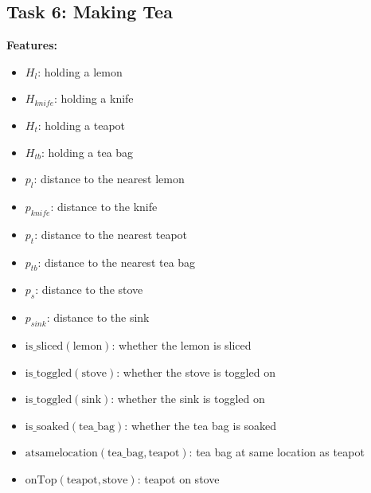 \subsection{Task 6: Making Tea}

\textbf{Features:}
\begin{itemize}[noitemsep]
    \item $H_l$: holding a lemon
    \item $H_{knife}$: holding a knife
    \item $H_t$: holding a teapot
    \item $H_{tb}$: holding a tea bag
    \item $p_l$: distance to the nearest lemon
    \item $p_{knife}$: distance to the knife
    \item $p_t$: distance to the nearest teapot
    \item $p_{tb}$: distance to the nearest tea bag
    \item $p_s$: distance to the stove
    \item $p_{sink}$: distance to the sink
    \item $\text{is\_sliced}(\text{lemon})$: whether the lemon is sliced
    \item $\text{is\_toggled}(\text{stove})$: whether the stove is toggled on
    \item $\text{is\_toggled}(\text{sink})$: whether the sink is toggled on
    \item $\text{is\_soaked}(\text{tea\_bag})$: whether the tea bag is soaked
    \item $\text{atsamelocation}(\text{tea\_bag}, \text{teapot})$: tea bag at same location as teapot
    \item $\text{onTop}(\text{teapot}, \text{stove})$: teapot on stove
\end{itemize}

